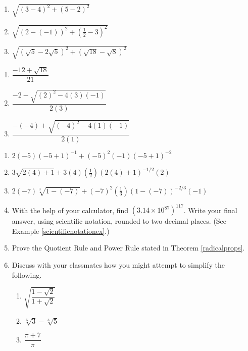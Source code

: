 \begin{multicols}{3}
\begin{enumerate}
\setcounter{enumi}{\value{HW}}

\item  $\sqrt{(3-4)^2 + (5-2)^2}$
\item  $\sqrt{(2 - (-1))^2 + \left(\frac{1}{2} - 3\right)^2}$ 
\item  $\sqrt{(\sqrt{5} - 2\sqrt{5})^2 + (\sqrt{18} - \sqrt{8})^2}$

\setcounter{HW}{\value{enumi}}
\end{enumerate}
\end{multicols}

\begin{multicols}{3}
\begin{enumerate}
\setcounter{enumi}{\value{HW}}

\item  $\dfrac{-12 + \sqrt{18}}{21}$
\item  $\dfrac{-2 - \sqrt{(2)^2 - 4(3)(-1)}}{2(3)}$  
\item  $\dfrac{-(-4) + \sqrt{(-4)^2 - 4(1)(-1)}}{2(1)}$

\setcounter{HW}{\value{enumi}}
\end{enumerate}
\end{multicols}

\begin{enumerate}
\setcounter{enumi}{\value{HW}}

\item $2(-5)(-5+1)^{-1} + (-5)^2(-1)(-5+1)^{-2}$
\item $3\sqrt{2(4)+1} + 3(4)\left(\frac{1}{2}\right)(2(4)+1)^{-1/2}(2)$
\item $2(-7)\sqrt[3]{1-(-7)} + (-7)^2 \left(\frac{1}{3}\right)(1-(-7))^{-2/3}(-1)$ \label{arithexlast}

\item With the help of your calculator, find $(3.14 \times 10^{87})^{117}$.  Write your final answer, using scientific notation, rounded to two decimal places. (See Example \ref{scientificnotationex}.)

\item Prove the Quotient Rule and Power Rule stated in Theorem \ref{radicalprops}.

\item Discuss with your classmates how you might attempt to simplify the following.

\begin{multicols}{3}
\begin{enumerate}
\item $\sqrt{\dfrac{1 - \sqrt{2}}{1 + \sqrt{2}}}$
\item $\sqrt[5]{3} - \sqrt[3]{5}$
\item $\dfrac{\pi + 7}{\pi}$
\end{enumerate}
\end{multicols}
\setcounter{HW}{\value{enumi}}
\end{enumerate}

